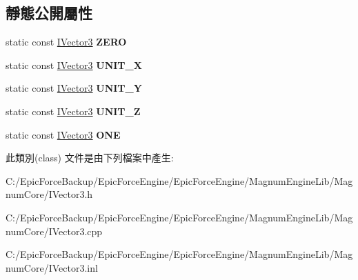 \subsection*{靜態公開屬性}
\begin{DoxyCompactItemize}
\item 
static const \hyperlink{class_magnum_1_1_i_vector3}{I\+Vector3} {\bfseries Z\+E\+RO}\hypertarget{class_magnum_1_1_i_vector3_a2e52690fa6ec027262fc867896718909}{}\label{class_magnum_1_1_i_vector3_a2e52690fa6ec027262fc867896718909}

\item 
static const \hyperlink{class_magnum_1_1_i_vector3}{I\+Vector3} {\bfseries U\+N\+I\+T\+\_\+X}\hypertarget{class_magnum_1_1_i_vector3_a36b184ae6c2e4999d60745b9025ae858}{}\label{class_magnum_1_1_i_vector3_a36b184ae6c2e4999d60745b9025ae858}

\item 
static const \hyperlink{class_magnum_1_1_i_vector3}{I\+Vector3} {\bfseries U\+N\+I\+T\+\_\+Y}\hypertarget{class_magnum_1_1_i_vector3_abe0b939e7f2fc2c5448ae2ed0ba4f9de}{}\label{class_magnum_1_1_i_vector3_abe0b939e7f2fc2c5448ae2ed0ba4f9de}

\item 
static const \hyperlink{class_magnum_1_1_i_vector3}{I\+Vector3} {\bfseries U\+N\+I\+T\+\_\+Z}\hypertarget{class_magnum_1_1_i_vector3_a10687852d1475d88db74b1eea550df00}{}\label{class_magnum_1_1_i_vector3_a10687852d1475d88db74b1eea550df00}

\item 
static const \hyperlink{class_magnum_1_1_i_vector3}{I\+Vector3} {\bfseries O\+NE}\hypertarget{class_magnum_1_1_i_vector3_a2446f9d90308abcb99fe9a81bb805ab3}{}\label{class_magnum_1_1_i_vector3_a2446f9d90308abcb99fe9a81bb805ab3}

\end{DoxyCompactItemize}


此類別(class) 文件是由下列檔案中產生\+:\begin{DoxyCompactItemize}
\item 
C\+:/\+Epic\+Force\+Backup/\+Epic\+Force\+Engine/\+Epic\+Force\+Engine/\+Magnum\+Engine\+Lib/\+Magnum\+Core/I\+Vector3.\+h\item 
C\+:/\+Epic\+Force\+Backup/\+Epic\+Force\+Engine/\+Epic\+Force\+Engine/\+Magnum\+Engine\+Lib/\+Magnum\+Core/I\+Vector3.\+cpp\item 
C\+:/\+Epic\+Force\+Backup/\+Epic\+Force\+Engine/\+Epic\+Force\+Engine/\+Magnum\+Engine\+Lib/\+Magnum\+Core/I\+Vector3.\+inl\end{DoxyCompactItemize}
